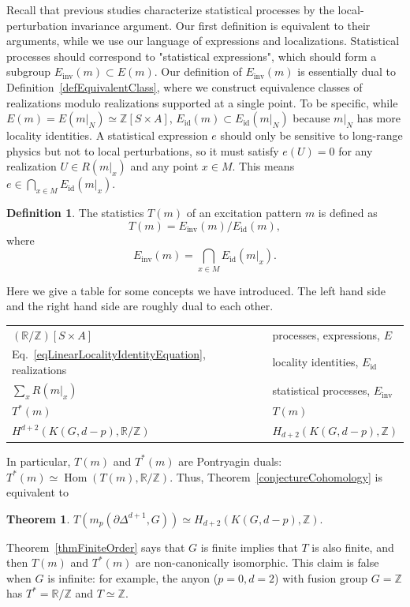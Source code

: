 \documentclass[reprint, amsmath, amssymb, showpacs, floatfix, longbibliography, aps, twocolumn, superscriptaddress, nofootinbib]{revtex4-2}
\newcommand{\ZZ}{{\mathbb Z}}
\newcommand{\RR}{{\mathbb R}}
\newcommand{\id}{{\operatorname{id}}}
\newcommand{\inv}{{\operatorname{inv}}}
\theoremstyle{definition}
\newtheorem{theorem}{Theorem}[section]
\newtheorem{definition}{Definition}[section]
\begin{document}
Recall that previous studies \cite{Kawagoe2020Microscopic,FHH21} characterize statistical processes by the local-perturbation invariance argument. Our first definition is equivalent to their arguments, while we use our language of expressions and localizations. Statistical processes should correspond to "statistical expressions", which should form a subgroup $E_{\operatorname{inv}}(m)\subset E(m)$. Our definition of $E_{\operatorname{inv}}(m)$ is essentially dual to Definition~\ref{defEquivalentClass}, where we construct equivalence classes of realizations modulo realizations supported at a single point.
To be specific, while $E(m)=E(m|_N)\simeq \ZZ[S\times A]$,  $E_{\operatorname{id}}(m)\subset E_{\operatorname{id}}(m|_N)$ because $m|_N$ has more locality identities. A statistical expression $e$ should only be sensitive to long-range physics but not to local perturbations, so it must satisfy $e(U)=0 $ for any realization $ U\in R(m|_x)$ and any point $x\in M$. This means $e\in \bigcap_{x\in M}E_{\operatorname{id}}(m|_x)$.

\begin{definition}\label{defStatisticsMain}
	The statistics $T(m)$ of an excitation pattern $m$ is defined as
	\begin{equation}
		T(m)=E_{\operatorname{inv}}(m)/E_{\operatorname{id}}(m),
	\end{equation}
 where
	\begin{equation}
		E_{\operatorname{inv}}(m)=\bigcap_{x\in M}E_{\operatorname{id}}(m|_x).
	\end{equation}
\end{definition}

Here we give a table for some concepts we have introduced. The left hand side and the right hand side are roughly dual to each other.

\begin{tabular}{l l}
	\hline
	$(\RR/\ZZ)[S\times A]$ &  processes, expressions, $E$ \\
	Eq.~\eqref{eqLinearLocalityIdentityEquation}, realizations & locality identities, $E_\id$ \\
	$\sum_x R(m|_x)$ & statistical processes, $E_\inv$ \\
	$T^*(m)$ & $T(m)$\\
	$H^{d+2}(K(G,d-p),\RR/\ZZ)$ & $H_{d+2}(K(G,d-p),\ZZ)$
	 \\ \hline
\end{tabular}


In particular,  $T(m)$ and $T^*(m)$ are Pontryagin duals: $T^*(m)\simeq \operatorname{Hom}(T(m),\RR/\ZZ)$. Thus, Theorem~\ref{conjectureCohomology} is equivalent to 
\begin{theorem}\label{thmHomology}
	$T(m_p(\partial\Delta^{d+1},G))\simeq H_{d+2}(K(G,d-p),\ZZ)$.
\end{theorem}
 Theorem~\ref{thmFiniteOrder} says that $G$ is finite implies that $T$ is also finite, and then $T(m)$ and $T^*(m)$ are non-canonically isomorphic. This claim is false when $G$ is infinite: for example, the anyon ($p=0,d=2$) with fusion group $G=\ZZ$ has $T^*=\RR/\ZZ$ and $T\simeq \ZZ$.
\end{document}
